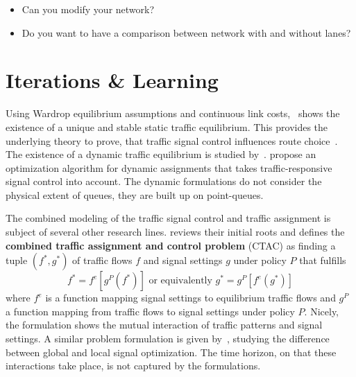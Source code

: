 \begin{itemize}
	\item Can you modify your network?
	\item Do you want to have a comparison between network with and without lanes?
\end{itemize}




\section{Iterations \& Learning}
\label{sec:signals_iterations_learning}


Using Wardrop equilibrium assumptions and continuous link costs,~\citet{Smith1979ExistenceUniquenessStabilityEquilibria} shows the existence of a unique and stable static traffic equilibrium. 
This provides the underlying theory to prove, that traffic signal control influences route choice~\citep{Smith1979TrafficControlRouteChoice}. 
The existence of a dynamic traffic equilibrium is studied by~\citet{Smith1993ModelDynamicUE}. 
\citet{SmithVanVuren1993TrafficEquilibriumResponsiveControl} propose an optimization algorithm for dynamic assignments that takes traffic-responsive signal control into account.  
The dynamic formulations do not consider the physical extent of queues, they are built up on point-queues. 

The combined modeling of the traffic signal control and traffic assignment is subject of several other research lines. 
\citet{Meneguzzer1997ModelReviewTrafficAssignmentSignalControl} reviews their initial roots and defines the {\bf combined traffic assignment and control problem} (CTAC) as finding a tuple $(f^{*}, g^{*})$ of traffic flows $f$ and signal settings $g$ under policy $P$ that fulfills  
\[
f^{*} = f^{e}[g^{P}(f^{*})] \mbox{  or  equivalently } g^{*} = g^{P}[f^{e}(g^{*})]
\]
where $f^{e}$ is a function mapping signal settings to equilibrium traffic flows and $g^{P}$ a function mapping from traffic flows to signal settings under policy $P$.  
Nicely, the formulation shows the mutual interaction of traffic patterns and signal settings. 
A similar problem formulation is given by~\citet{CascettaGalloMontella2006SignalsWithStochAssignment}, studying the difference between global and local signal optimization. 
The time horizon, on that these interactions take place, is not captured by the formulations. 

